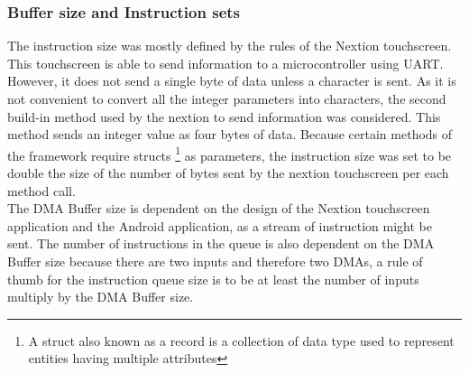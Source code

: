 \subsubsection{Buffer size and Instruction sets}
The instruction size was mostly defined by the rules of the Nextion touchscreen. This touchscreen is able to send information to a microcontroller using UART. However, it does not send a single byte of data unless a character is sent. As it is not convenient to convert all the integer parameters into characters, the second build-in method used by the nextion to send information was considered. This method sends an integer value as four bytes of data. Because certain methods of the framework require structs \footnote{A struct also known as a record is a collection of data type used to represent entities having multiple attributes} as parameters, the instruction size was set to be double the size of the number of bytes sent by the nextion touchscreen per each method call. \\
The DMA Buffer size is dependent on the design of the Nextion touchscreen application and the Android application, as a stream of instruction might be sent. The number of instructions in the queue is also dependent on the DMA Buffer size because there are two inputs and therefore two DMAs, a rule of thumb for the instruction queue size is to be at least the number of inputs multiply by the DMA Buffer size.\\

